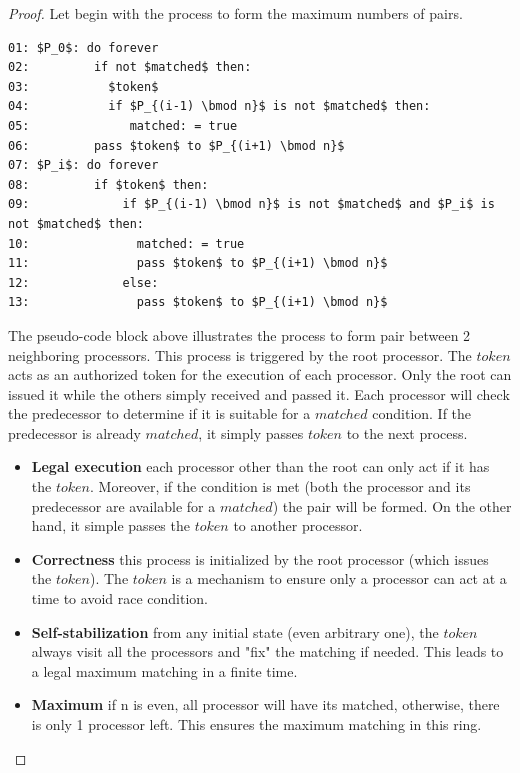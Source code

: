 \documentclass[12pt]{article}
\begin{document}
\bigskip

\begin{proof}

Let begin with the process to form the maximum numbers of pairs.

\begin{lstlisting}
01: $P_0$: do forever
02:         if not $matched$ then:
03:           $token$
04:           if $P_{(i-1) \bmod n}$ is not $matched$ then:
05:              matched: = true
06:         pass $token$ to $P_{(i+1) \bmod n}$
07: $P_i$: do forever
08:         if $token$ then:
09:             if $P_{(i-1) \bmod n}$ is not $matched$ and $P_i$ is not $matched$ then:
10:               matched: = true
11:               pass $token$ to $P_{(i+1) \bmod n}$
12:             else:
13:               pass $token$ to $P_{(i+1) \bmod n}$
\end{lstlisting}

The pseudo-code block above illustrates the process to form pair between 2 neighboring processors. This process is
triggered by the root processor. The $token$ acts as an authorized token for the execution of each processor. Only 
the root can issued it while the others simply received and passed it. Each processor will check the predecessor to
determine if it is suitable for a $matched$ condition. If the predecessor is already $matched$, it simply passes 
$token$ to the next process.

\begin{itemize}
  \item \textbf{Legal execution} each processor other than the root can only act if it has the $token$. Moreover,
  if the condition is met (both the processor and its predecessor are available for a $matched$) the pair will be
  formed. On the other hand, it simple passes the $token$ to another processor.
  \item \textbf{Correctness} this process is initialized by the root processor (which issues the $token$). The $token$
  is a mechanism to ensure only a processor can act at a time to avoid race condition. 
  \item \textbf{Self-stabilization} from any initial state (even arbitrary one), the $token$ always visit all the processors
  and "fix" the matching if needed. This leads to a legal maximum matching in a finite time.
  \item \textbf{Maximum} if n is even, all processor will have its matched, otherwise, there is only 1 processor left. This
  ensures the maximum matching in this ring.
\end{itemize}
\end{proof}

\vspace{3in}
\end{document}
